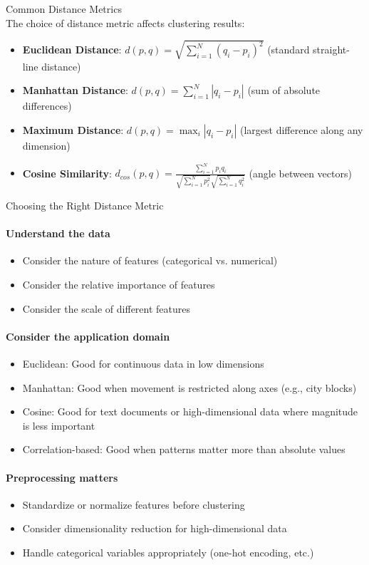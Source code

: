 \begin{definition}{Common Distance Metrics}\\
The choice of distance metric affects clustering results:
\begin{itemize}
    \item \textbf{Euclidean Distance}: $d(p, q) = \sqrt{\sum_{i=1}^{N} (q_i - p_i)^2}$ (standard straight-line distance)
    \item \textbf{Manhattan Distance}: $d(p, q) = \sum_{i=1}^{N} |q_i - p_i|$ (sum of absolute differences)
    \item \textbf{Maximum Distance}: $d(p, q) = \max_i |q_i - p_i|$ (largest difference along any dimension)
    \item \textbf{Cosine Similarity}: $d_{cos}(p, q) = \frac{\sum_{i=1}^{N} p_i q_i}{\sqrt{\sum_{i=1}^{N} p_i^2} \sqrt{\sum_{i=1}^{N} q_i^2}}$ (angle between vectors)
\end{itemize}
\end{definition}

\begin{KR}{Choosing the Right Distance Metric}
\paragraph{Understand the data}
\begin{itemize}
    \item Consider the nature of features (categorical vs. numerical)
    \item Consider the relative importance of features
    \item Consider the scale of different features
\end{itemize}

\paragraph{Consider the application domain}
\begin{itemize}
    \item Euclidean: Good for continuous data in low dimensions
    \item Manhattan: Good when movement is restricted along axes (e.g., city blocks)
    \item Cosine: Good for text documents or high-dimensional data where magnitude is less important
    \item Correlation-based: Good when patterns matter more than absolute values
\end{itemize}

\paragraph{Preprocessing matters}
\begin{itemize}
    \item Standardize or normalize features before clustering
    \item Consider dimensionality reduction for high-dimensional data
    \item Handle categorical variables appropriately (one-hot encoding, etc.)
\end{itemize}
\end{KR}

